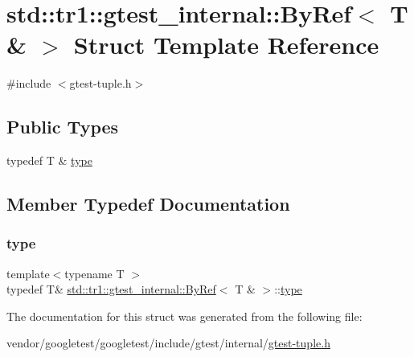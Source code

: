 \hypertarget{structstd_1_1tr1_1_1gtest__internal_1_1_by_ref_3_01_t_01_6_01_4}{}\section{std\+:\+:tr1\+:\+:gtest\+\_\+internal\+:\+:By\+Ref$<$ T \& $>$ Struct Template Reference}
\label{structstd_1_1tr1_1_1gtest__internal_1_1_by_ref_3_01_t_01_6_01_4}


{\ttfamily \#include $<$gtest-\/tuple.\+h$>$}

\subsection*{Public Types}
\begin{DoxyCompactItemize}
\item 
typedef T \& \hyperlink{structstd_1_1tr1_1_1gtest__internal_1_1_by_ref_3_01_t_01_6_01_4_a512382574dbdd736320d68e313801122}{type}
\end{DoxyCompactItemize}


\subsection{Member Typedef Documentation}
\mbox{\label{structstd_1_1tr1_1_1gtest__internal_1_1_by_ref_3_01_t_01_6_01_4_a512382574dbdd736320d68e313801122}} 
\subsubsection{\texorpdfstring{type}{type}}
{\footnotesize\ttfamily template$<$typename T $>$ \\
typedef T\& \hyperlink{structstd_1_1tr1_1_1gtest__internal_1_1_by_ref}{std\+::tr1\+::gtest\+\_\+internal\+::\+By\+Ref}$<$ T \& $>$\+::\hyperlink{structstd_1_1tr1_1_1gtest__internal_1_1_by_ref_3_01_t_01_6_01_4_a512382574dbdd736320d68e313801122}{type}}



The documentation for this struct was generated from the following file\+:\begin{DoxyCompactItemize}
\item 
vendor/googletest/googletest/include/gtest/internal/\hyperlink{gtest-tuple_8h}{gtest-\/tuple.\+h}\end{DoxyCompactItemize}

